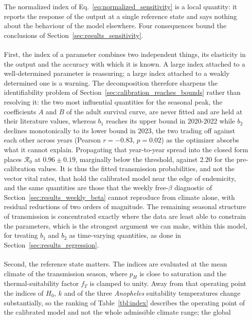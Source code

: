 \documentclass[a4paper,fleqn]{cas-dc}
\begin{document}
The normalized index of Eq.~\eqref{eq:normalized_sensitivity} is a local
quantity: it reports the response of the output at a single reference
state and says nothing about the behaviour of the model elsewhere. Four
consequences bound the conclusions of
Section~\ref{sec:results_sensitivity}.
\\\\
First, the index of a parameter combines two independent things, its
elasticity in the output and the accuracy with which it is known. A
large index attached to a well-determined parameter is reassuring; a
large index attached to a weakly determined one is a warning. The
decomposition therefore sharpens the identifiability problem of
Section~\ref{sec:calibration_reaches_bounds} rather than resolving it:
the two most influential quantities for the seasonal peak, the
coefficients $A$ and $B$ of the adult survival curve, are never fitted
and are held at their literature values, whereas $b_1$ reaches its upper
bound in 2020-2022 while $b_2$ declines monotonically to its lower bound
in 2023, the two trading off against each other across years (Pearson
$r = -0.83$, $p = 0.02$) as the optimizer absorbs what it cannot explain.
Propagating that year-to-year spread into the closed form places
$\mathcal{R}_0$ at $0.96 \pm 0.19$, marginally below the threshold,
against $2.20$ for the pre-calibration values. It is thus the fitted
transmission probabilities, and not the vector vital rates, that hold the
calibrated model near the edge of endemicity, and the same quantities are
those that the weekly free-$\beta$ diagnostic of
Section~\ref{sec:results_weekly_beta} cannot reproduce from climate alone,
with residual reductions of two orders of magnitude. The remaining
seasonal structure of transmission is concentrated exactly where the data
are least able to constrain the parameters, which is the strongest
argument we can make, within this model, for treating $b_1$ and $b_2$ as
time-varying quantities, as done in
Section~\ref{sec:results_regression}.
\\\\
Second, the reference state matters. The indices are evaluated at the
mean climate of the transmission season, where $p_H$ is close to
saturation and the thermal-suitability factor $f_T$ is clamped to unity.
Away from that operating point the indices of $H_0$, $k$ and of the three
\textit{Anopheles} suitability temperatures change substantially, so the
ranking of Table~\ref{tbl:index} describes the operating point of the
calibrated model and not the whole admissible climate range; the global
\end{document}
